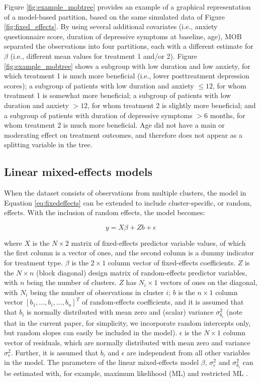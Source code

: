 \documentclass[nobf,man]{apa}
\begin{document}
Figure \ref{fig:example_mobtree} provides an example of a graphical representation of a model-based partition, based on the same simulated data of Figure \ref{fig:fixed_effects}. By using several additional covariates (i.e., anxiety questionnaire score, duration of depressive symptoms at baseline, age), MOB separated the observations into four partitions, each with a different estimate for $\beta$ (i.e., different mean values for treatment 1 and/or 2). Figure \ref{fig:example_mobtree} shows a subgroup with low duration and low anxiety, for which treatment 1 is much more beneficial (i.e., lower posttreatment depression scores); a subgroup of patients with low duration and anxiety $\leq 12$, for whom treatment 1 is somewhat more beneficial; a subgroup of patients with low duration and anxiety $> 12$, for whom treatment 2 is slightly more beneficial; and a subgroup of patients with duration of depressive symptoms $> 6$ months, for whom treatment 2 is much more beneficial. Age did not have a main or moderating effect on treatment outcomes, and therefore does not appear as a splitting variable in the tree.




\subsection{Linear mixed-effects models}

When the dataset consists of observations from multiple clusters, the model in Equation \ref{eq:fixedeffects} can be extended to include cluster-specific, or random, effects. With the inclusion of random effects, the model becomes:

\begin{equation}
\label{eq:mixedeffects}
	y = X \beta + Z b + \epsilon
\end{equation}

where $X$ is the $N \times 2$ matrix of fixed-effects predictor variable values, of which the first column is a vector of ones, and the second column is a dummy indicator for treatment type. $\beta$ is the $2 \times 1$ column vector of fixed-effects coefficients. $Z$ is the $N \times n$ (block diagonal) design matrix of random-effects predictor variables, with $n$ being the number of clusters. $Z$ has $N_i \times 1$ vectors of ones on the diagonal, with $N_i$ being the number of observations in cluster $i$; $b$ is the $n \times 1$ column vector ${\left[ {b_1},...,{b_i},...,{b_n} \right]}^{T}$ of random-effects coefficients, and it is assumed that that $b_{i}$ is normally distributed with mean zero and (scalar) variance $\sigma^{2}_{b_i}$ (note that in the current paper, for simplicity, we incorporate random intercepts only, but random slopes can easily be included in the model). $\epsilon$ is the $N \times 1$ column vector of residuals, which are normally distributed with mean zero and variance $\sigma^{2}_{\epsilon}$. Further, it is assumed that $b_{i}$ and $\epsilon$ are independent from all other variables in the model. The parameters of the linear mixed-effects model $\beta$,  $\sigma^{2}_{\epsilon}$ and $\sigma^{2}_{b_i}$ can be estimated with, for example, maximum likelihood (ML) and restricted ML \cite{LairyWare82}.
\end{document}
